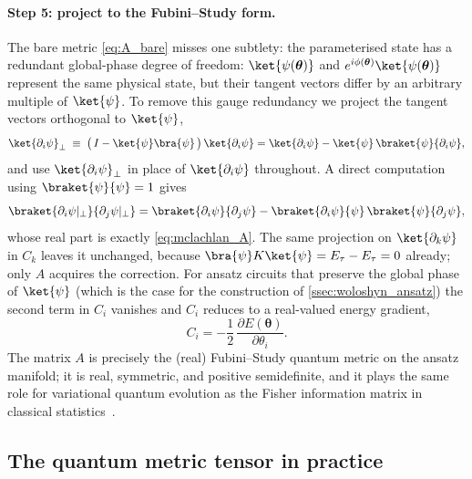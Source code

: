 \paragraph{Step 5: project to the Fubini--Study form.}
The bare metric \cref{eq:A_bare} misses one subtlety: the parameterised
state has a redundant global-phase degree of freedom: $\ket{\psi(\bm{\theta})}$
and $e^{i\phi(\bm{\theta})}\ket{\psi(\bm{\theta})}$ represent the same
physical state, but their tangent vectors differ by an arbitrary
multiple of $\ket{\psi}$. To remove this gauge redundancy we project the
tangent vectors orthogonal to $\ket{\psi}$,
\begin{equation}
  \label{eq:proj_tangent}
  \ket{\partial_i\psi}_{\perp}
  \;\equiv\;
  \bigl(\,I - \ket{\psi}\bra{\psi}\,\bigr)\,\ket{\partial_i\psi}
  = \ket{\partial_i\psi} - \ket{\psi}\,\braket{\psi}{\partial_i\psi},
\end{equation}
and use $\ket{\partial_i\psi}_{\perp}$ in place of
$\ket{\partial_i\psi}$ throughout. A direct computation using
$\braket{\psi}{\psi}=1$ gives
\begin{equation*}
  \braket{\partial_i\psi|_{\perp}}{\partial_j\psi|_{\perp}}
  = \braket{\partial_i\psi}{\partial_j\psi}
   - \braket{\partial_i\psi}{\psi}\,\braket{\psi}{\partial_j\psi},
\end{equation*}
whose real part is exactly \cref{eq:mclachlan_A}. The same projection
on $\ket{\partial_k\psi}$ in $C_k$ leaves it unchanged, because
$\bra{\psi}K\ket{\psi} = E_\tau - E_\tau = 0$ already; only $A$ acquires
the correction.
For ansatz circuits that preserve the global phase of $\ket{\psi}$ (which
is the case for the construction of \cref{ssec:woloshyn_ansatz}) the
second term in $C_i$ vanishes and $C_i$ reduces to a real-valued energy
gradient,
\begin{equation}
  \label{eq:mclachlan_C_simplified}
  C_i = -\frac{1}{2}\,\frac{\partial E(\bm{\theta})}{\partial\theta_i}.
\end{equation}
The matrix $A$ is precisely the (real) Fubini--Study quantum metric on the
ansatz manifold; it is real, symmetric, and positive semidefinite, and it
plays the same role for variational quantum evolution as the Fisher
information matrix in classical statistics~\cite{stokes2020}.

\subsection{The quantum metric tensor in practice}
\label{ssec:metric_tensor}

